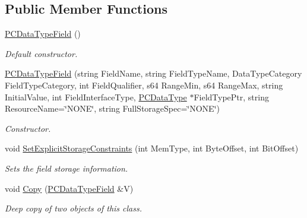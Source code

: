 \subsection*{Public Member Functions}
\begin{DoxyCompactItemize}
\item 
\hyperlink{classpc__emulator_1_1PCDataTypeField_ad79aded41d3f9f6c3502e8d7d784a1f8}{P\+C\+Data\+Type\+Field} ()\hypertarget{classpc__emulator_1_1PCDataTypeField_ad79aded41d3f9f6c3502e8d7d784a1f8}{}\label{classpc__emulator_1_1PCDataTypeField_ad79aded41d3f9f6c3502e8d7d784a1f8}

\begin{DoxyCompactList}\small\item\em Default constructor. \end{DoxyCompactList}\item 
\hyperlink{classpc__emulator_1_1PCDataTypeField_aff9ec977701c593f8b6ac163907780d5}{P\+C\+Data\+Type\+Field} (string Field\+Name, string Field\+Type\+Name, Data\+Type\+Category Field\+Type\+Category, int Field\+Qualifier, s64 Range\+Min, s64 Range\+Max, string Initial\+Value, int Field\+Interface\+Type, \hyperlink{classpc__emulator_1_1PCDataType}{P\+C\+Data\+Type} $\ast$Field\+Type\+Ptr, string Resource\+Name=\char`\"{}N\+O\+NE\char`\"{}, string Full\+Storage\+Spec=\char`\"{}N\+O\+NE\char`\"{})\hypertarget{classpc__emulator_1_1PCDataTypeField_aff9ec977701c593f8b6ac163907780d5}{}\label{classpc__emulator_1_1PCDataTypeField_aff9ec977701c593f8b6ac163907780d5}

\begin{DoxyCompactList}\small\item\em Constructor. \end{DoxyCompactList}\item 
void \hyperlink{classpc__emulator_1_1PCDataTypeField_abe1a07fb12fbf19ec2686d463ba60222}{Set\+Explicit\+Storage\+Constraints} (int Mem\+Type, int Byte\+Offset, int Bit\+Offset)\hypertarget{classpc__emulator_1_1PCDataTypeField_abe1a07fb12fbf19ec2686d463ba60222}{}\label{classpc__emulator_1_1PCDataTypeField_abe1a07fb12fbf19ec2686d463ba60222}

\begin{DoxyCompactList}\small\item\em Sets the field storage information. \end{DoxyCompactList}\item 
void \hyperlink{classpc__emulator_1_1PCDataTypeField_a22e511238476e273c4004ca0094d2917}{Copy} (\hyperlink{classpc__emulator_1_1PCDataTypeField}{P\+C\+Data\+Type\+Field} \&V)\hypertarget{classpc__emulator_1_1PCDataTypeField_a22e511238476e273c4004ca0094d2917}{}\label{classpc__emulator_1_1PCDataTypeField_a22e511238476e273c4004ca0094d2917}

\begin{DoxyCompactList}\small\item\em Deep copy of two objects of this class. \end{DoxyCompactList}\end{DoxyCompactItemize}

